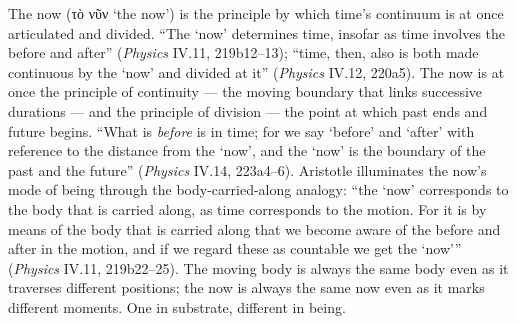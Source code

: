 \documentclass{article}
\newcommand{\gk}[1]{{\greekfont #1}}
\begin{document}
The now (\gk{τὸ νῦν} `the now') is the principle by which time's continuum is at once articulated and divided. ``The `now' determines time, insofar as time involves the before and after'' (\textit{Physics} IV.11, 219b12--13); ``time, then, also is both made continuous by the `now' and divided at it'' (\textit{Physics} IV.12, 220a5). The now is at once the principle of continuity --- the moving boundary that links successive durations --- and the principle of division --- the point at which past ends and future begins. ``What is \textit{before} is in time; for we say `before' and `after' with reference to the distance from the `now', and the `now' is the boundary of the past and the future'' (\textit{Physics} IV.14, 223a4--6). Aristotle illuminates the now's mode of being through the body-carried-along analogy: ``the `now' corresponds to the body that is carried along, as time corresponds to the motion. For it is by means of the body that is carried along that we become aware of the before and after in the motion, and if we regard these as countable we get the `now''' (\textit{Physics} IV.11, 219b22--25). The moving body is always the same body even as it traverses different positions; the now is always the same now even as it marks different moments. One in substrate, different in being.
\end{document}
